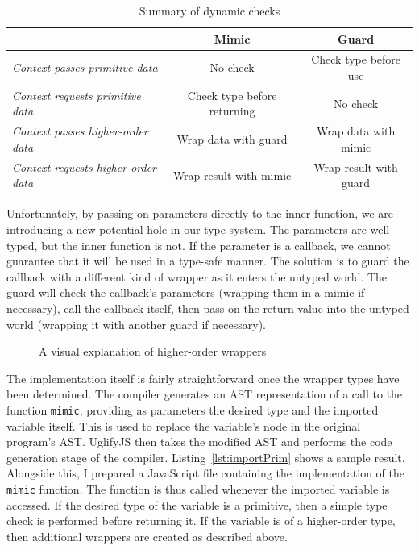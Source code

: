 \documentclass[12pt,a4paper,twoside,openright]{report}
\theoremstyle{definition}
\theoremstyle{dotless}
\begin{document}
\begin{table}[b]
  \begin{tabular}{@{}lcc@{}}
	\toprule
    & \textbf{Mimic} & \textbf{Guard}               \\ \midrule
	\textit{Context passes primitive data}   & No check & Check type before use        \\
	\textit{Context requests primitive data} & Check type before returning & No check \\
	\textit{Context passes higher-order data} & Wrap data with guard & Wrap data with mimic \\
	\textit{Context requests higher-order data} & Wrap result with mimic & Wrap result with guard \\

	\bottomrule
  \end{tabular}
  \caption{Summary of dynamic checks}
  \label{tbl:chkSummary}
\end{table}
Unfortunately, by passing on parameters directly to the inner function, we are
introducing a new potential hole in our type system. The parameters are well
typed, but the inner function is not. If the parameter is a callback, we cannot guarantee that
it will be used in a type-safe manner. The solution is to guard the callback
with a different kind of wrapper as it enters the untyped world. The guard
will check the callback's parameters (wrapping them in a mimic if necessary),
call the callback itself, then pass on the return value into the untyped world
(wrapping it with another guard if necessary). 

\begin{figure}[h]
  \centering
  \caption{A visual explanation of higher-order wrappers}
  \label{fig:wrappers}
\end{figure}


The implementation itself is fairly straightforward once the wrapper types have
been determined. The compiler generates an AST representation of a call to the
function \texttt{mimic}, providing as parameters the desired type and the
imported variable itself. This is used to replace the variable's node in the
original program's AST. UglifyJS then takes the modified AST and performs the
code generation stage of the compiler. Listing~\ref{lst:importPrim} shows a
sample result. Alongside this, I prepared a JavaScript file containing the
implementation of the \texttt{mimic} function.  The function is thus called
whenever the imported variable is accessed. If the desired type of the variable
is a primitive, then a simple type check is performed before returning it. If
the variable is of a higher-order type, then additional wrappers are created as
described above.
\end{document}
